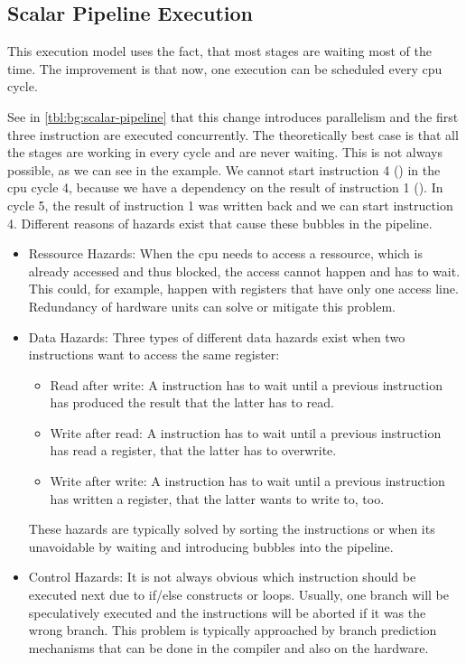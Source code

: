 \subsection{Scalar Pipeline Execution}
This execution model uses the fact, that most stages are waiting most of the time.
The improvement is that now, one execution can be scheduled every \ac{cpu} cycle.

See in \cref{tbl:bg:scalar-pipeline} that this change introduces parallelism and the first three instruction are executed concurrently.
The theoretically best case is that all the stages are working in every cycle and are never waiting.
This is not always possible, as we can see in the example.
We cannot start instruction 4 () in the \ac{cpu} cycle 4, because we have a dependency on the result of instruction 1 ().
In cycle 5, the result of instruction 1 was written back and we can start instruction 4.
Different reasons of hazards exist that cause these bubbles in the pipeline.
\begin{itemize}
    \item Ressource Hazards:
        When the \ac{cpu} needs to access a ressource, which is already accessed and thus blocked, the access cannot happen and has to wait.
        This could, for example, happen with registers that have only one access line.
        Redundancy of hardware units can solve or mitigate this problem.
    \item Data Hazards:
        Three types of different data hazards exist when two instructions want to access the same register:
        \begin{itemize}
            \item Read after write: A instruction has to wait until a previous instruction has produced the result that the latter has to read.
            \item Write after read: A instruction has to wait until a previous instruction has read a register, that the latter has to overwrite.
            \item Write after write: A instruction has to wait until a previous instruction has written a register, that the latter wants to write to, too.
        \end{itemize}
        These hazards are typically solved by sorting the instructions or when its unavoidable by waiting and introducing bubbles into the pipeline.
    \item Control Hazards:
        It is not always obvious which instruction should be executed next due to if/else constructs or loops.
        Usually, one branch will be speculatively executed and the instructions will be aborted if it was the wrong branch.
        This problem is typically approached by branch prediction mechanisms that can be done in the compiler and also on the hardware.
\end{itemize}

